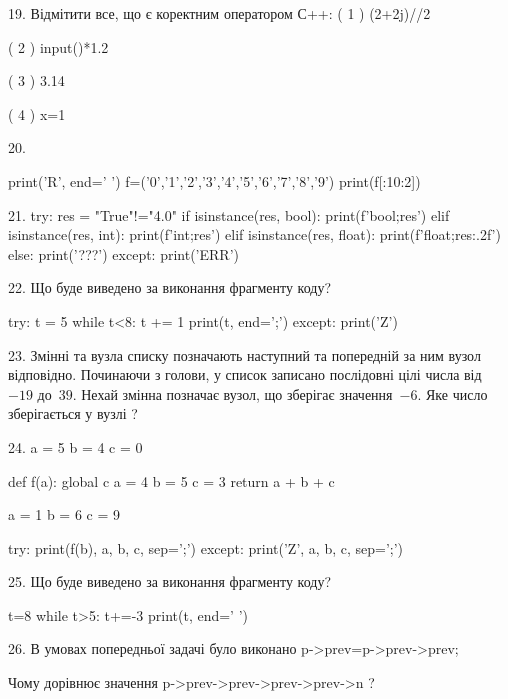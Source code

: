 \documentclass[11pt]{article}
\begin{document}

19. %
Відмітити все, що є коректним оператором С++:
( 1 ) (2+2j)//2

( 2 ) input()*1.2

( 3 ) 3.14%

( 4 ) x=1%


20. 

print('R', end=' ')
f=('0','1','2','3','4','5','6','7','8','9')
print(f[:10:2])



21. 
try:
    res = "True"!="4.0"
    if isinstance(res, bool):
        print(f'bool;{res}')
    elif isinstance(res, int):
        print(f'int;{res}')
    elif isinstance(res, float):
        print(f'float;{res:.2f}')
    else:
        print('???')
except:
    print('ERR')


22. Що буде виведено за виконання фрагменту коду?

try:
    t = 5
    while t<8:
        t += 1
    print(t, end=';')
except:
    print('Z')



23. 
Змінні  та  вузла списку позначають наступний та попередній за ним вузол відповідно. Починаючи з голови, у список записано послідовні цілі числа від~$-19$ до~$39$. Нехай змінна  позначає вузол, що зберігає значення~$-6$.
Яке число зберігається у вузлі  ?


24. 
a = 5
b = 4
c = 0

def f(a):
global c    a = 4
    b = 5
    c = 3
    return a + b + c

a = 1
b = 6
c = 9

try:
    print(f(b), a, b, c, sep=';')
except:
    print('Z', a, b, c, sep=';')


25. Що буде виведено за виконання фрагменту коду?

t=8
while t>5:
    t+=-3
print(t, end=' ')



26. 
В умовах попередньої задачі було виконано p->prev=p->prev->prev;

Чому дорівнює значення p->prev->prev->prev->prev->n ?
\end{document}
